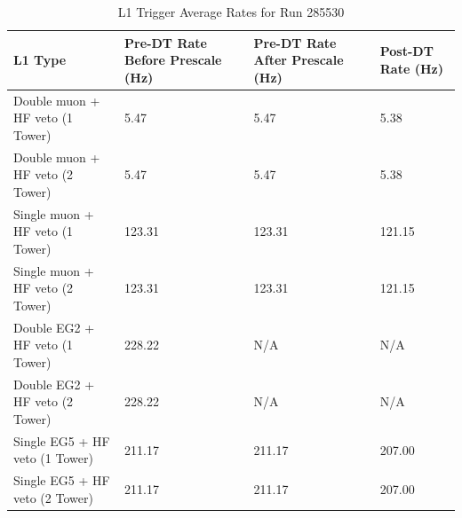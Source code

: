 \begin{table}[h!]
\centering
\caption{L1 Trigger Average Rates for Run 285530}
\label{table:trigL1UPC2016}
\begin{tabular}{@{}l|p{1.6cm}|p{1.6cm}|p{1.6cm}|}
\toprule
L1 Type                           & Pre-DT Rate Before Prescale (Hz) & Pre-DT Rate After Prescale (Hz) & Post-DT Rate (Hz) \\ \midrule
Double muon + HF veto (1 Tower) & 5.47             & 5.47                 & 5.38            \\
Double muon + HF veto (2 Tower) & 5.47             & 5.47                 & 5.38            \\
Single muon + HF veto (1 Tower) & 123.31	       & 123.31               & 121.15          \\
Single muon + HF veto (2 Tower) & 123.31           & 123.31               & 121.15             \\
Double EG2 + HF veto (1 Tower)  & 228.22           & N/A                  & N/A            \\
Double EG2 + HF veto (2 Tower)  & 228.22           & N/A                  & N/A            \\
Single EG5 + HF veto (1 Tower)  & 211.17           & 211.17                & 207.00	              \\ 
Single EG5 + HF veto (2 Tower)  & 211.17           & 211.17                & 207.00	              \\ 
\bottomrule
\end{tabular}
\end{table}

